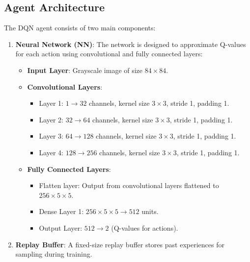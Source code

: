 \documentclass[a4paper,12pt]{article}
\begin{document}
\subsection{Agent Architecture}
The DQN agent consists of two main components:
\begin{enumerate}
    \item \textbf{Neural Network (NN)}: The network is designed to approximate Q-values for each action using convolutional and fully connected layers:
    \begin{itemize}
        \item \textbf{Input Layer}: Grayscale image of size \(84 \times 84\).
        \item \textbf{Convolutional Layers}:
        \begin{itemize}
            \item Layer 1: \(1 \rightarrow 32\) channels, kernel size \(3 \times 3\), stride 1, padding 1.
            \item Layer 2: \(32 \rightarrow 64\) channels, kernel size \(3 \times 3\), stride 1, padding 1.
            \item Layer 3: \(64 \rightarrow 128\) channels, kernel size \(3 \times 3\), stride 1, padding 1.
            \item Layer 4: \(128 \rightarrow 256\) channels, kernel size \(3 \times 3\), stride 1, padding 1.
        \end{itemize}
        \item \textbf{Fully Connected Layers}:
        \begin{itemize}
            \item Flatten layer: Output from convolutional layers flattened to \(256 \times 5 \times 5\).
            \item Dense Layer 1: \(256 \times 5 \times 5 \rightarrow 512\) units.
            \item Output Layer: \(512 \rightarrow 2\) (Q-values for actions).
        \end{itemize}
    \end{itemize}
    \item \textbf{Replay Buffer}: A fixed-size replay buffer stores past experiences for sampling during training.
\end{enumerate}
\end{document}
